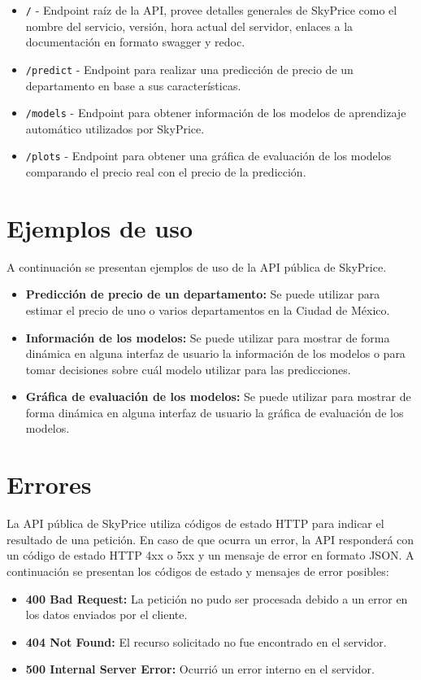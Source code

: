 \begin{itemize}
\item \texttt{/} - Endpoint raíz de la API, provee detalles generales de SkyPrice
como el nombre del servicio, versión, hora actual del servidor, enlaces a la
documentación en formato swagger y redoc.
\item \texttt{/predict} - Endpoint para realizar una predicción de precio de un
departamento en base a sus características.
\item \texttt{/models} - Endpoint para obtener información de los modelos de
aprendizaje automático utilizados por SkyPrice.
\item \texttt{/plots} - Endpoint para obtener una gráfica de evaluación de los
modelos comparando el precio real con el precio de la predicción.
\end{itemize}

\section{Ejemplos de uso}
A continuación se presentan ejemplos de uso de la API pública de SkyPrice.

\begin{itemize}
\item \textbf{Predicción de precio de un departamento:} Se puede utilizar para
estimar el precio de uno o varios departamentos en la Ciudad de México.
\item \textbf{Información de los modelos:} Se puede utilizar para mostrar
de forma dinámica en alguna interfaz de usuario la información de los modelos o
para tomar decisiones sobre cuál modelo utilizar para las predicciones.
\item \textbf{Gráfica de evaluación de los modelos:} Se puede utilizar para
mostrar de forma dinámica en alguna interfaz de usuario la gráfica de evaluación
de los modelos.
\end{itemize}

\section{Errores}
La API pública de SkyPrice utiliza códigos de estado HTTP para indicar el resultado
de una petición. En caso de que ocurra un error, la API responderá con un código de
estado HTTP 4xx o 5xx y un mensaje de error en formato JSON. A continuación se
presentan los códigos de estado y mensajes de error posibles:

\begin{itemize}
\item \textbf{400 Bad Request:} La petición no pudo ser procesada debido a un error
en los datos enviados por el cliente.
\item \textbf{404 Not Found:} El recurso solicitado no fue encontrado en el servidor.
\item \textbf{500 Internal Server Error:} Ocurrió un error interno en el servidor.
\end{itemize}

